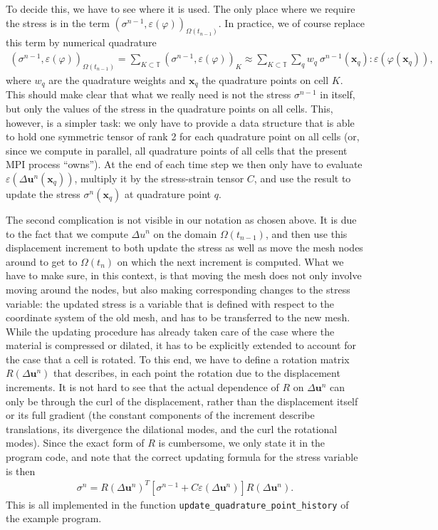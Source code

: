 \documentclass{article}
\renewcommand{\vec}[1]{\mathbf{#1}}
\begin{document}
To decide this, we have to see where it is used. The only place where we
require the stress is in the term
$(\sigma^{n-1},\varepsilon(\varphi))_{\Omega(t_{n-1})}$. In practice, we of
course replace this term by numerical quadrature
\begin{gather}
  (\sigma^{n-1},\varepsilon(\varphi))_{\Omega(t_{n-1})}
  =
  \sum_{K\subset {\mathbb{T}}}
  (\sigma^{n-1},\varepsilon(\varphi))_K
  \approx
  \sum_{K\subset {\mathbb{T}}}
  \sum_q
  w_q \ \sigma^{n-1}(\vec x_q) : \varepsilon(\varphi(\vec x_q)),
\end{gather}
where $w_q$ are the quadrature weights and $\vec x_q$ the quadrature points on
cell $K$. This should make clear that what we really need is not the stress
$\sigma^{n-1}$ in itself, but only the values of the stress in the quadrature
points on all cells. This, however, is a simpler task: we only have to provide
a data structure that is able to hold one symmetric tensor of rank 2 for each
quadrature point on all cells (or, since we compute in parallel, all
quadrature points of all cells that the present MPI process ``owns''). At the
end of each time step we then only have to evaluate $\varepsilon(\Delta \vec
u^n(\vec x_q))$, multiply it by the stress-strain tensor $C$, and use the
result to update the stress $\sigma^n(\vec x_q)$ at quadrature point $q$.

The second complication is not visible in our notation as chosen above. It is
due to the fact that we compute $\Delta u^n$ on the domain $\Omega(t_{n-1})$,
and then use this displacement increment to both update the stress as well as
move the mesh nodes around to get to $\Omega(t_n)$ on which the next increment
is computed. What we have to make sure, in this context, is that moving the
mesh does not only involve moving around the nodes, but also making
corresponding changes to the stress variable: the updated stress is a variable
that is defined with respect to the coordinate system of the old mesh, and has
to be transferred to the new mesh. While the updating procedure has already
taken care of the case where the material is compressed or dilated, it has to
be explicitly extended to account for the case that a cell is rotated. To this
end, we have to define a rotation matrix $R(\Delta \vec u^n)$ that describes,
in each point the rotation due to the displacement increments. It is not hard
to see that the actual dependence of $R$ on $\Delta \vec u^n$ can only be
through the curl of the displacement, rather than the displacement itself or
its full gradient (the constant components of the increment describe
translations, its divergence the dilational modes, and the curl the rotational
modes). Since the exact form of $R$ is cumbersome, we only state it in the
program code, and note that the correct updating formula for the stress
variable is then
\begin{gather}
  \label{eq:stress-update+rot}
  \sigma^n
  = 
  R(\Delta \vec u^n)^T 
  [\sigma^{n-1} + C \varepsilon (\Delta \vec u^n)]
  R(\Delta \vec u^n).
\end{gather}
This is all implemented in the function
\texttt{update\_\-quadrature\_\-point\_history} of the example program.
\end{document}
